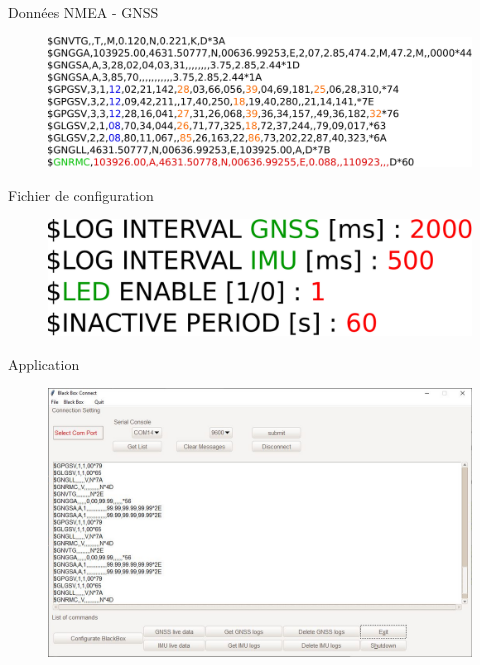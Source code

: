 \documentclass{beamer}
\begin{document}
\begin{frame}{Données NMEA - GNSS}	
	\begin{figure}[h]
		\centering
		\includegraphics[width=0.9\linewidth]{../figures/presentation/donnees-NMEA}
	\end{figure}
	\begin{figure}[h]
		\centering
	\end{figure}
\end{frame}

\begin{frame}{Fichier de configuration}
	\begin{figure}[h]
		\centering
		\includegraphics[width=0.7\linewidth]{../figures/presentation/config}
	\end{figure}
\end{frame}

\begin{frame}{Application}
	\begin{figure}[H]
		\centering
		\includegraphics[width=.9\linewidth]{../figures/application/screen_logGnss}
	\end{figure}
\end{frame}
\end{document}
